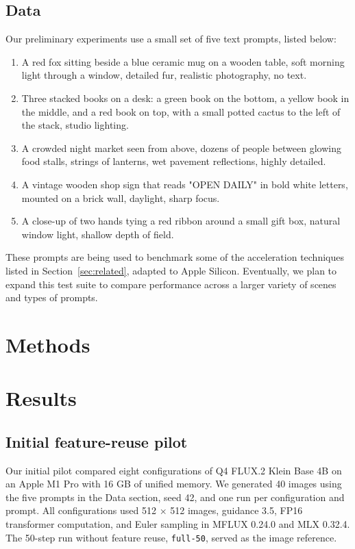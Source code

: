 \documentclass[12pt,letterpaper]{article}
\begin{document}
\subsection{Data}
Our preliminary experiments use a small set of five text prompts, listed below:

\begin{enumerate}
    \item A red fox sitting beside a blue ceramic mug on a wooden table, soft morning light through a window, detailed fur, realistic photography, no text.
    \item Three stacked books on a desk: a green book on the bottom, a yellow book in the middle, and a red book on top, with a small potted cactus to the left of the stack, studio lighting.
    \item A crowded night market seen from above, dozens of people between glowing food stalls, strings of lanterns, wet pavement reflections, highly detailed.
    \item A vintage wooden shop sign that reads "OPEN DAILY" in bold white letters, mounted on a brick wall, daylight, sharp focus.
    \item A close-up of two hands tying a red ribbon around a small gift box, natural window light, shallow depth of field.
\end{enumerate}

These prompts are being used to benchmark some of the acceleration techniques listed in Section~\ref{sec:related}, adapted to Apple Silicon. Eventually, we plan to expand this test suite to compare performance across a larger variety of scenes and types of prompts.



\section{Methods}

\section{Results}

\subsection{Initial feature-reuse pilot}

Our initial pilot compared eight configurations of Q4 FLUX.2 Klein Base 4B on an Apple M1 Pro with 16 GB of unified memory. We generated 40 images using the five prompts in the Data section, seed 42, and one run per configuration and prompt. All configurations used 512 $\times$ 512 images, guidance 3.5, FP16 transformer computation, and Euler sampling in MFLUX 0.24.0 and MLX 0.32.4. The 50-step run without feature reuse, \texttt{full-50}, served as the image reference.
\end{document}
